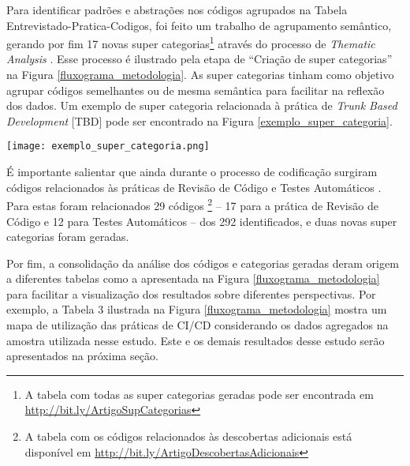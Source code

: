 Para identificar padrões e abstrações nos códigos agrupados na Tabela Entrevistado-Pratica-Codigos, foi feito um trabalho de agrupamento semântico, gerando por fim 17 novas super categorias\footnote{A tabela com todas as super categorias geradas pode ser encontrada em \url{http://bit.ly/ArtigoSupCategorias}} através do processo de \emph{Thematic Analysis} \cite{groundedTheory}. Esse processo é ilustrado pela etapa de ``Criação de super categorias'' na Figura \ref{fluxograma_metodologia}. As super categorias tinham como objetivo agrupar códigos semelhantes ou de mesma semântica para facilitar na reflexão dos dados. Um exemplo de super categoria relacionada à prática de \emph{Trunk Based Development} [TBD] pode ser encontrado na Figura \ref{exemplo_super_categoria}.


\begin{figure*}[ht]
\begin{center}
\texttt{[image: exemplo\_super\_categoria.png]}
\end{center}
\caption[Exemplo de super categoria]{
    Exemplo de super categoria gerada durante o processo de \emph{Thematic Analysis}.
}\label{exemplo_super_categoria}
\end{figure*}


É importante salientar que ainda durante o processo de codificação surgiram códigos relacionados às práticas de Revisão de Código \cite{codeReview} e Testes Automáticos \cite{devopsBook}. Para estas foram relacionados 29 códigos \footnote{A tabela com os códigos relacionados às descobertas adicionais está disponível em \url{http://bit.ly/ArtigoDescobertasAdicionais} } -- 17 para a prática de Revisão de Código e 12 para Testes Automáticos -- dos 292 identificados, e duas novas super categorias foram geradas.

Por fim, a consolidação da análise dos códigos e categorias geradas deram origem a diferentes tabelas como a apresentada na Figura \ref{fluxograma_metodologia} para facilitar a visualização dos resultados sobre diferentes perspectivas. Por exemplo, a Tabela 3 ilustrada na Figura \ref{fluxograma_metodologia} mostra um mapa de utilização das práticas de CI/CD considerando os dados agregados na amostra utilizada nesse estudo. Este e os demais resultados desse estudo serão apresentados na próxima seção.
